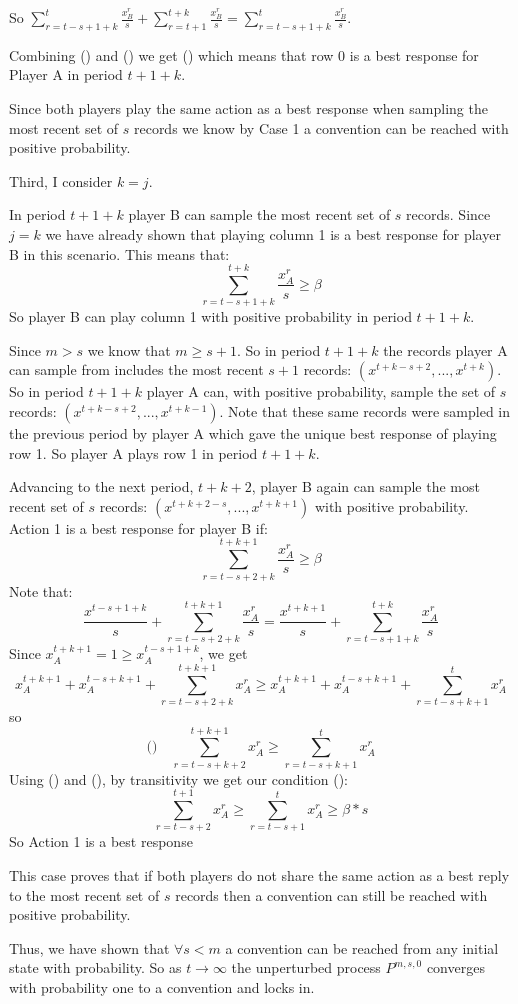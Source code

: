 \documentclass{article}
\begin{document}
So $\sum\limits_{r=t-s+1+k}^{t}\frac{x^r_B}{s}+\sum\limits_{r=t+1}^{t+k} \frac{x^r_B}{s}=\sum\limits_{r=t-s+1+k}^{t}\frac{x^r_B}{s}$.

Combining () and () we get () which means that row 0 is a best response for Player A in period $t+1+k$.

Since both players play the same action as a best response when sampling the most recent set of $s$ records we know by Case 1 a convention can be reached with positive probability.

\vskip12pt

Third, I consider $k=j$.

In period $t+1+k$ player B can sample the most recent set of $s$ records. Since $j=k$ we have already shown that playing column 1 is a best response for player B in this scenario. This means that:
$$\sum\limits_{r=t-s+1+k}^{t+k} \frac{x^r_A}{s} \geq \beta$$ 
So player B can play column 1 with positive probability in period $t+1+k$. 

Since $m>s$ we know that $m \geq s+1$. So in period $t+1+k$ the records player A can sample from includes the most recent $s+1$ records: $(x^{t+k-s+2},...,x^{t+k})$. So in period $t+1+k$ player A can, with positive probability, sample the set of $s$ records: $(x^{t+k-s+2},...,x^{t+k-1})$. Note that these same records were sampled in the previous period by player A which gave the unique best response of playing row 1. So player A plays row 1 in period $t+1+k$.

Advancing to the next period, $t+k+2$, player B again can sample the most recent set of $s$ records: $(x^{t+k+2-s},...,x^{t+k+1})$ with positive probability. Action 1 is a best response for player B if:
$$\sum\limits_{r=t-s+2+k}^{t+k+1} \frac{x^r_A}{s} \geq \beta$$
Note that:
$$\frac{x^{t-s+1+k}}{s} + \sum\limits_{r=t-s+2+k}^{t+k+1}\frac{x^r_A}{s} = \frac{x^{t+k+1}}{s} + \sum\limits_{r=t-s+1+k}^{t+k} \frac{x^r_A}{s}$$
Since 
$x^{t+k+1}_A = 1 \geq x^{t-s+1+k}_A$, we get
$$x^{t+k+1}_A+x^{t-s+k+1}_A+\sum\limits_{r=t-s+2+k}^{t+k+1} x^r_A \geq x^{t+k+1}_A+x^{t-s+k+1}_A+\sum\limits_{r=t-s+k+1}^t x^r_A$$
so
$$\text{()} \hspace{12pt} \sum\limits_{r=t-s+k+2}^{t+k+1} x^r_A \geq \sum\limits_{r=t-s+k+1}^t x^r_A $$
Using () and (), by transitivity we get our condition ():
$$\sum\limits_{r=t-s+2}^{t+1} x^r_A \geq \sum\limits_{r=t-s+1}^t x^r_A \geq \beta*s$$
So Action 1 is a best response 

\vskip12pt

This case proves that if both players do not share the same action as a best reply to the most recent set of $s$ records then a convention can still be reached with positive probability.

\vskip18pt

Thus, we have shown that $\forall s<m$ a convention can be reached from any initial state with probability. So as $t \rightarrow \infty$ the unperturbed process $P^{m,s,0}$ converges with probability one to a convention and locks in.
\end{document}
